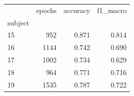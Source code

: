 \begin{tabular}{lrrr}
\toprule
 & epochs & accuracy & f1_macro \\
subject &  &  &  \\
\midrule
15 & 952 & 0.871 & 0.814 \\
16 & 1144 & 0.742 & 0.690 \\
17 & 1002 & 0.734 & 0.629 \\
18 & 964 & 0.771 & 0.716 \\
19 & 1535 & 0.787 & 0.722 \\
\bottomrule
\end{tabular}
